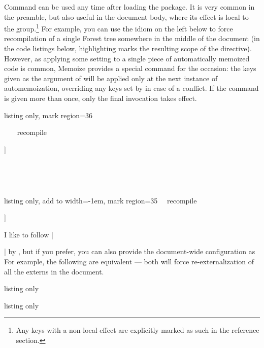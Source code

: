 \documentclass[a4paper,11pt]{article}
\begin{document}
Command  can be used any time after loading the package.  It is
very common in the preamble, but also useful in the document body, where its
effect is local to the  group.\footnote{Any keys with a non-local
  effect are explicitly marked as such in the reference section.} For example,
you can use the idiom on the left below to force recompilation of a single
Forest tree somewhere in the middle of the document (in the code listings
below, highlighting marks the resulting scope of the 
directive).  However, as applying some setting to a single piece of
automatically memoized code is common, Memoize provides a special command for
the occasion: the keys given as the argument of  will be
applied only at the next instance of automemoization, overriding any keys set
by  in case of a conflict.  If the command is given more than
once, only the final invocation takes effect.

\begin{tcbraster}[raster columns=2, raster equal height=rows, raster force size=false]
\begin{tcblisting}{listing only, mark region={3}{6}}
~{~
  ~\mmzset~{recompile}
  \begin{forest}
    [VP[V][DP]]
  \end{forest}
~}~
\end{tcblisting}
\begin{tcblisting}{listing only, add to width=-1em, mark region={3}{5}}
~\mmznext~{recompile}
\begin{forest}
  [VP[V][DP]]
\end{forest}

\end{tcblisting} 
\end{tcbraster}

I like to follow |\usepackage{memoize}| by , but if you prefer,
you can also provide the document-wide configuration as 
For example, the following are equivalent --- both will force
re-externalization of all the externs in the document.

\begin{tcbraster}[raster columns=2, raster equal height=rows]
  \begin{tcblisting}{listing only}
\usepackage{memoize}
  \end{tcblisting}
  \begin{tcblisting}{listing only}
\usepackage[recompile]{memoize}
  \end{tcblisting}
\end{tcbraster}
\end{document}
